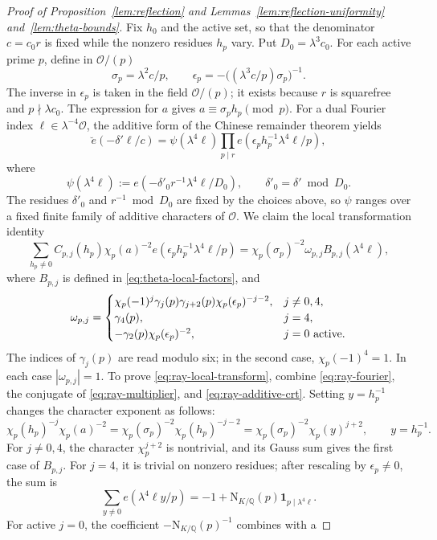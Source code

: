 \documentclass[11pt,a4paper]{article}
\numberwithin{equation}{section}
\numberwithin{figure}{section}
\theoremstyle{definition}
\theoremstyle{remark}
\newcommand{\Q}{\mathbb Q}
\newcommand{\NK}{\mathrm N_{K/\Q}}
\newcommand{\OO}{\mathcal O}
\newcommand{\ind}{\mathbf1}
\begin{document}
\begin{proof}[Proof of Proposition~\ref{lem:reflection} and Lemmas~\ref{lem:reflection-uniformity} and~\ref{lem:theta-bounds}]
Fix $h_0$ and the active set, so that the denominator $c=c_0r$
is fixed while the nonzero residues $h_p$ vary. Put
$D_0=\lambda^3c_0$. For each active prime $p$, define in $\OO/(p)$
\[
 \sigma_p=\lambda^2c/p,\qquad
 \epsilon_p=-\bigl((\lambda^3c/p)\sigma_p\bigr)^{-1}.
\]
The inverse in $\epsilon_p$ is taken in the field $\OO/(p)$;
it exists because $r$ is squarefree and $p\nmid\lambda c_0$.
The expression for $a$ gives \(a\equiv\sigma_ph_p\pmod p\).
For a dual Fourier index
$\ell\in\lambda^{-4}\OO$, the additive form of the Chinese remainder theorem yields
\begin{equation}\label{eq:ray-additive-crt}
\breve e(-\delta'\ell/c)
 =\psi(\lambda^4\ell)\prod_{p\mid r}e(\epsilon_ph_p^{-1}\lambda^4\ell/p),
\end{equation}
where
\[
 \psi(\lambda^4\ell):=e(-\delta'_0r^{-1}\lambda^4\ell/D_0),
 \qquad \delta'_0=\delta'\bmod D_0.
\]
The residues $\delta'_0$ and $r^{-1}\bmod D_0$ are fixed by the
choices above, so $\psi$ ranges over a fixed finite family of
additive characters of $\OO$.
We claim the local transformation identity
\begin{equation}\label{eq:ray-local-transform}
\sum_{h_p\ne0} C_{p,j}(h_p)\chi_p(a)^{-2}
 e(\epsilon_ph_p^{-1}\lambda^4\ell/p)
 =\chi_p(\sigma_p)^{-2}\omega_{p,j}B_{p,j}(\lambda^4\ell),
\end{equation}
where $B_{p,j}$ is defined in \eqref{eq:theta-local-factors}, and
\[
 \omega_{p,j}=
 \begin{cases}
 \chi_p(-1)^j\gamma_j(p)\gamma_{j+2}(p)\chi_p(\epsilon_p)^{-j-2},&j\ne0,4,\\
 \gamma_4(p),&j=4,\\
 -\gamma_2(p)\chi_p(\epsilon_p)^{-2},&j=0\ {\rm active}.
 \end{cases}
\]
The indices of $\gamma_j(p)$ are read modulo six; in the second case, $\chi_p(-1)^4=1$.
In each case $|\omega_{p,j}|=1$. To prove
\eqref{eq:ray-local-transform}, combine \eqref{eq:ray-fourier}, the
conjugate of \eqref{eq:ray-multiplier}, and
\eqref{eq:ray-additive-crt}. Setting $y=h_p^{-1}$ changes the
character exponent as follows:
\[
 \chi_p(h_p)^{-j}\chi_p(a)^{-2} =\chi_p(\sigma_p)^{-2}\chi_p(h_p)^{-j-2} =\chi_p(\sigma_p)^{-2}\chi_p(y)^{j+2}, \qquad y=h_p^{-1}.
\]
For $j\ne0,4$, the character $\chi_p^{j+2}$ is nontrivial, and its
Gauss sum gives the first case of $B_{p,j}$.
For $j=4$, it is trivial on nonzero residues; after rescaling by
$\epsilon_p\ne0$, the sum is
\[
 \sum_{y\ne0}e(\lambda^4\ell y/p)
 =-1+\NK(p)\ind_{p\mid\lambda^4\ell}.
\]
For active $j=0$, the coefficient $-\NK(p)^{-1}$ combines with a

\end{proof}
\end{document}
